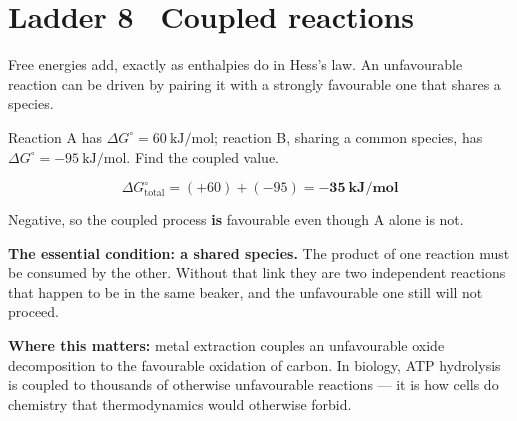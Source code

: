 \documentclass{apchem-worksheet}
\begin{document}
\section*{\sffamily Ladder 8 \textbullet\ Coupled reactions}

Free energies add, exactly as enthalpies do in Hess's law. An unfavourable
reaction can be driven by pairing it with a strongly favourable one that
shares a species.

\begin{workedexample}
Reaction A has $\Delta G^\circ = \SI{+60}{\kilo\joule\per\mole}$;
reaction B, sharing a common species, has
$\Delta G^\circ = \SI{-95}{\kilo\joule\per\mole}$. Find the coupled value.

\[ \Delta G^\circ_{\text{total}} = (+60) + (-95) = \mathbf{-35~kJ/mol} \]

Negative, so the coupled process \textbf{is} favourable even though A
alone is not.

\textbf{The essential condition: a shared species.} The product of one
reaction must be consumed by the other. Without that link they are two
independent reactions that happen to be in the same beaker, and the
unfavourable one still will not proceed.

\textbf{Where this matters:} metal extraction couples an unfavourable
oxide decomposition to the favourable oxidation of carbon. In biology,
ATP hydrolysis is coupled to thousands of otherwise unfavourable
reactions --- it is how cells do chemistry that thermodynamics would
otherwise forbid.
\end{workedexample}
\end{document}
